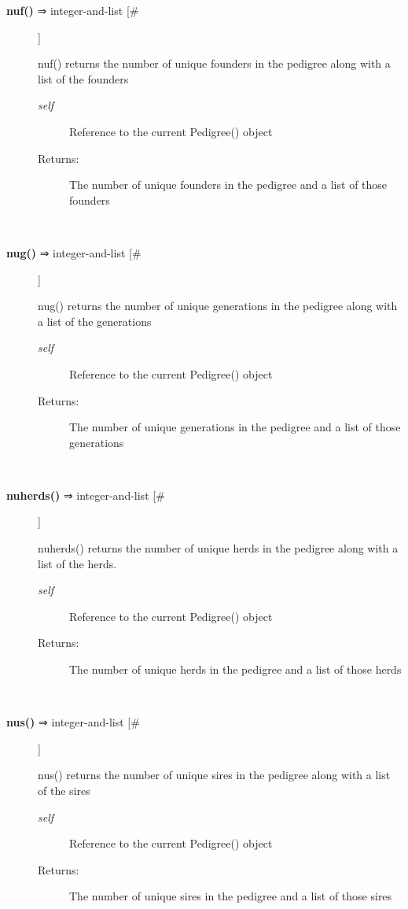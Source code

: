 \begin{description}
\item[\textbf{nuf()}
 ⇒ integer-and-list [\#]]

 nuf() returns the number of unique founders in the pedigree along with a list of the founders
\begin{description}
\item[\emph{self}
] Reference to the current Pedigree() object
\item[Returns:] The number of unique founders in the pedigree and a list of those founders

\end{description}
\\ 

\item[\textbf{nug()}
 ⇒ integer-and-list [\#]]

 nug() returns the number of unique generations in the pedigree along with a list of the generations
\begin{description}
\item[\emph{self}
] Reference to the current Pedigree() object
\item[Returns:] The number of unique generations in the pedigree and a list of those generations

\end{description}
\\ 

\item[\textbf{nuherds()}
 ⇒ integer-and-list [\#]]

 nuherds() returns the number of unique herds in the pedigree along with a list of the herds.
\begin{description}
\item[\emph{self}
] Reference to the current Pedigree() object
\item[Returns:] The number of unique herds in the pedigree and a list of those herds

\end{description}
\\ 

\item[\textbf{nus()}
 ⇒ integer-and-list [\#]]

 nus() returns the number of unique sires in the pedigree along with a list of the sires
\begin{description}
\item[\emph{self}
] Reference to the current Pedigree() object
\item[Returns:] The number of unique sires in the pedigree and a list of those sires


\end{description}
\end{description}
